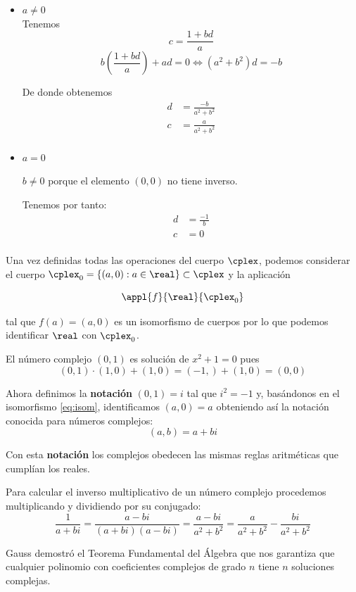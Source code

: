 \documentclass{apuntes}
\begin{document}
\begin{itemize}
\item \textbf{$a \neq 0$}\\

Tenemos
\[c = \frac{1+bd}{a} \]
\[b\left(\frac{1+bd}{a}\right)+ad = 0 \iff (a^2+b^2)d = -b\]

De donde obtenemos
\begin{align*}
d & = \frac{-b}{a^2+b^2}\\
c & = \frac{a}{a^2+b^2}\\
\end{align*}

\item \textbf{$a=0$}

$b \neq 0$ porque el elemento $(0,0)$ no tiene inverso.

Tenemos por tanto:
\begin{align*}
d & = \frac{-1}{b}\\
c & = 0\\
\end{align*}
\end{itemize}

Una vez definidas todas las operaciones del cuerpo $\cplex$, podemos considerar el cuerpo $\cplex_0=\{(a,0): a \in \real\} \subset \cplex$ y la aplicación

\begin{equation} \label{eq:isom}
\appl{f}{\real}{\cplex_0}
\end{equation}

tal que $f(a)=(a,0)$ es un isomorfismo de cuerpos por lo que podemos identificar $\real$ con $\cplex_0$.

El número complejo $(0,1)$ es solución de $x^2+1=0$ pues
\[(0,1)\cdot(1,0)+(1,0)=(-1,)+(1,0)=(0,0)\]

Ahora definimos la \textbf{notación} $(0,1)=i$ tal que $i^2=-1$ y, basándonos en el isomorfismo \eqref{eq:isom}, identificamos $(a,0)=a$ obteniendo así la notación conocida para números complejos:
\[(a,b)=a+bi\]

Con esta \textbf{notación} los complejos obedecen las mismas reglas aritméticas que cumplían los reales.

Para calcular el inverso multiplicativo de un número complejo procedemos multiplicando y dividiendo por su conjugado:
\[\frac{1}{a+bi}=\frac{a-bi}{(a+bi)(a-bi)} = \frac{a-bi}{a^2+b^2} = \frac{a}{a^2+b^2}-\frac{bi}{a^2+b^2}\]

Gauss demostró el Teorema Fundamental del Álgebra que nos garantiza que cualquier polinomio con coeficientes complejos de grado $n$ tiene $n$ soluciones complejas.
\end{document}

